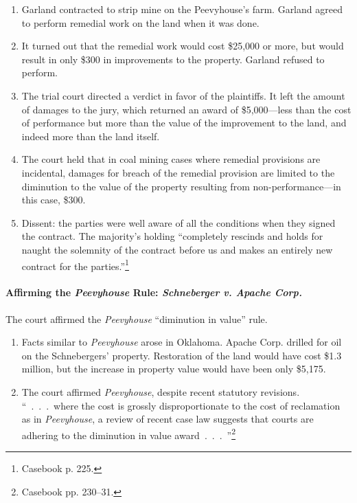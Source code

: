 \begin{enumerate}
    \item Garland contracted to strip mine on the Peevyhouse's farm. Garland 
    agreed to perform remedial work on the land when it was done.
    \item It turned out that the remedial work would cost \$25,000 or more, 
    but would result in only \$300 in improvements to the property. Garland 
    refused to perform.
    \item The trial court directed a verdict in favor of the plaintiffs. It 
    left the amount of damages to the jury, which returned an award of 
    \$5,000---less than the cost of performance but more than the value of the 
    improvement to the land, and indeed more than the land itself.
    \item The court held that in coal mining cases where remedial provisions 
    are incidental, damages for breach of the remedial provision are limited 
    to the diminution to the value of the property resulting from 
    non-performance---in this case, \$300.
    \item Dissent: the parties were well aware of all the conditions when they 
    signed the contract. The majority's holding ``completely rescinds and 
    holds for naught the solemnity of the contract before us and makes an 
    entirely new contract for the parties.''\footnote{Casebook p. 225.}
\end{enumerate}

\paragraph{Affirming the \emph{Peevyhouse} Rule: \emph{Schneberger v. Apache 
Corp.}}

The court affirmed the \emph{Peevyhouse} ``diminution in value'' rule.

\begin{enumerate}
    \item Facts similar to \emph{Peevyhouse} arose in Oklahoma. Apache Corp. 
    drilled for oil on the Schnebergers' property. Restoration of the land 
    would have cost \$1.3 million, but the increase in property value would 
    have been only \$5,175. 
    \item The court affirmed \emph{Peevyhouse}, despite recent statutory 
    revisions. ``~.~.~.~where the cost is grossly disproportionate to the cost 
    of reclamation as in \emph{Peevyhouse}, a review of recent case law 
    suggests that courts are adhering to the diminution in value 
    award~.~.~.~''\footnote{Casebook pp. 230--31.}
\end{enumerate}

